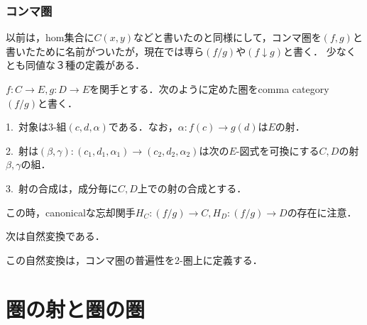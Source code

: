 \documentclass[uplatex, dvipdfmx]{jsreport}
\begin{document}
\subsection{コンマ圏}

以前は，hom集合に$C(x,y)$などと書いたのと同様にして，コンマ圏を$(f,g)$と書いたために名前がついたが，現在では専ら$(f/g)$や$(f\downarrow g)$と書く．
少なくとも同値な３種の定義がある．

\begin{definition}\rm{}
    $f:C\to E, g:D\to E$を関手とする．次のように定めた圏をcomma category $(f/g)$と書く．

    1.\, 対象は3-組$(c,d,\alpha )$である．なお，$\alpha :f(c)\to g(d)$は$E$の射．

    2.\, 射は$(\beta ,\gamma ):(c_1, d_1, \alpha_1)\to (c_2, d_2, \alpha_2)$は次の$E$-図式を可換にする$C,D$の射$\beta,\gamma$の組．
    \begin{center}\end{center}

    3.\, 射の合成は，成分毎に$C,D$上での射の合成とする．

    この時，canonicalな忘却関手$H_C:(f/g)\to C, H_D:(f/g)\to D$の存在に注意．
\end{definition}

\begin{proposition}
    次は自然変換である．
    \begin{center}\end{center}
\end{proposition}

この自然変換は，コンマ圏の普遍性を2-圏上に定義する．
\begin{definition}[コンマ圏の普遍性]
    
\end{definition}

\chapter{圏の射と圏の圏}
\end{document}
